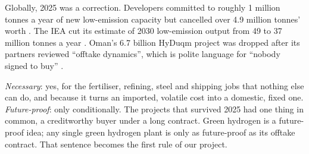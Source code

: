 Globally, 2025 was a correction. Developers committed to roughly 1 million tonnes a year of new low-emission capacity but cancelled over 4.9 million tonnes' worth \cite{chemworld2026}. The IEA cut its estimate of 2030 low-emission output from 49 to 37 million tonnes a year \cite{ieanews2025}. Oman's \usd{}6.7 billion HyDuqm project was dropped after its partners reviewed ``offtake dynamics'', which is polite language for ``nobody signed to buy'' \cite{meed2025}. \confH

\begin{verdict}
\emph{Necessary}: yes, for the fertiliser, refining, steel and shipping jobs that nothing else can do, and because it turns an imported, volatile cost into a domestic, fixed one. \emph{Future-proof}: only conditionally. The projects that survived 2025 had one thing in common, a creditworthy buyer under a long contract. Green hydrogen is a future-proof idea; any single green hydrogen plant is only as future-proof as its offtake contract. That sentence becomes the first rule of our project. \confH
\end{verdict}
